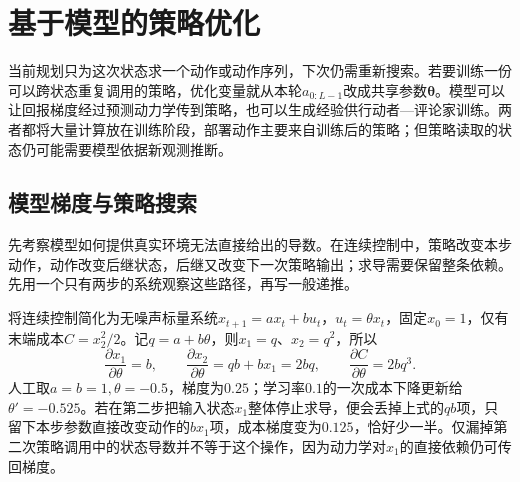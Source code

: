 \section{基于模型的策略优化}
\label{sec:rl-learning-model-policy}

当前规划只为这次状态求一个动作或动作序列，下次仍需重新搜索。若要训练一份可以跨状态重复调用的策略，优化变量就从本轮$a_{0:L-1}$改成共享参数$\bm\theta$。模型可以让回报梯度经过预测动力学传到策略，也可以生成经验供行动者—评论家训练。两者都将大量计算放在训练阶段，部署动作主要来自训练后的策略；但策略读取的状态仍可能需要模型依据新观测推断。

\subsection{模型梯度与策略搜索}
\label{sec:rl-learning-model-gradient}

先考察模型如何提供真实环境无法直接给出的导数。在连续控制中，策略改变本步动作，动作改变后继状态，后继又改变下一次策略输出；求导需要保留整条依赖。先用一个只有两步的系统观察这些路径，再写一般递推。

\begin{example}[两步模型梯度]
  \label{ex:rl-learning-two-step-gradient}
  将连续控制简化为无噪声标量系统$x_{t+1}=ax_t+bu_t$，$u_t=\theta x_t$，固定$x_0=1$，仅有末端成本$C=x_2^2/2$。记$q=a+b\theta$，则$x_1=q$、$x_2=q^2$，所以
  \[
    \frac{\partial x_1}{\partial\theta}=b,\qquad
    \frac{\partial x_2}{\partial\theta}
       =q b+b x_1=2bq,\qquad
    \frac{\partial C}{\partial\theta}=2bq^3.
  \]
  人工取$a=b=1,\theta=-0.5$，梯度为$0.25$；学习率$0.1$的一次成本下降更新给$\theta'=-0.525$。若在第二步把输入状态$x_1$整体停止求导，便会丢掉上式的$q b$项，只留下本步参数直接改变动作的$b x_1$项，成本梯度变为$0.125$，恰好少一半。仅漏掉第二次策略调用中的状态导数并不等于这个操作，因为动力学对$x_1$的直接依赖仍可传回梯度。
\end{example}

